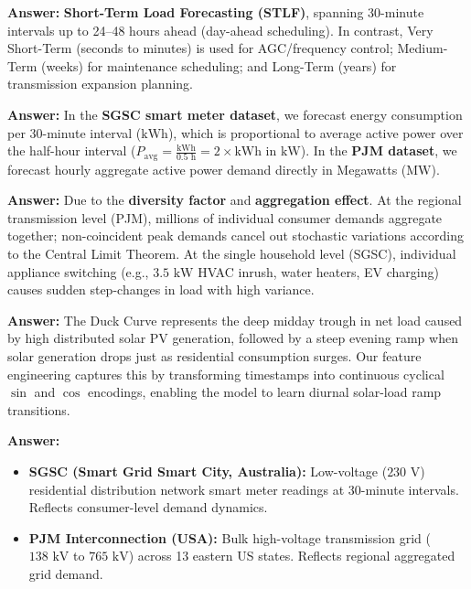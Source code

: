 \documentclass[11pt,a4paper]{article}
\begin{document}
\begin{qnabox}
\textbf{Answer:} \textbf{Short-Term Load Forecasting (STLF)}, spanning 30-minute intervals up to 24--48 hours ahead (day-ahead scheduling). In contrast, Very Short-Term (seconds to minutes) is used for AGC/frequency control; Medium-Term (weeks) for maintenance scheduling; and Long-Term (years) for transmission expansion planning.
\end{qnabox}

\begin{qnabox}
\textbf{Answer:} In the \textbf{SGSC smart meter dataset}, we forecast energy consumption per 30-minute interval ($\text{kWh}$), which is proportional to average active power over the half-hour interval ($P_{\text{avg}} = \frac{\text{kWh}}{0.5\text{ h}} = 2 \times \text{kWh}$ in $\text{kW}$). In the \textbf{PJM dataset}, we forecast hourly aggregate active power demand directly in Megawatts ($\text{MW}$).
\end{qnabox}

\begin{qnabox}
\textbf{Answer:} Due to the \textbf{diversity factor} and \textbf{aggregation effect}. At the regional transmission level (PJM), millions of individual consumer demands aggregate together; non-coincident peak demands cancel out stochastic variations according to the Central Limit Theorem. At the single household level (SGSC), individual appliance switching (e.g., $3.5\text{ kW}$ HVAC inrush, water heaters, EV charging) causes sudden step-changes in load with high variance.
\end{qnabox}

\begin{qnabox}
\textbf{Answer:} The Duck Curve represents the deep midday trough in net load caused by high distributed solar PV generation, followed by a steep evening ramp when solar generation drops just as residential consumption surges. Our feature engineering captures this by transforming timestamps into continuous cyclical $\sin$ and $\cos$ encodings, enabling the model to learn diurnal solar-load ramp transitions.
\end{qnabox}

\begin{qnabox}
\textbf{Answer:} 
\begin{itemize}[leftmargin=12pt,itemsep=1pt]
    \item \textbf{SGSC (Smart Grid Smart City, Australia):} Low-voltage ($230\text{ V}$) residential distribution network smart meter readings at 30-minute intervals. Reflects consumer-level demand dynamics.
    \item \textbf{PJM Interconnection (USA):} Bulk high-voltage transmission grid ($138\text{ kV}$ to $765\text{ kV}$) across 13 eastern US states. Reflects regional aggregated grid demand.
\end{itemize}
\end{qnabox}
\end{document}
